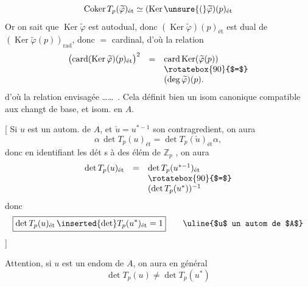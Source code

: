 \[
\operatorname{Coker}T_p(\widetilde\varphi)_{\text{ét}}\simeq(\operatorname{Ker}\unsure{(}\widetilde\varphi)(p)_{\text{ét}}
\]
Or on sait que $\operatorname{Ker}\widetilde\varphi$ est autodual, donc $(\operatorname{Ker}\widetilde\varphi)(p)_{\text{ét}}$ est dual de $(\operatorname{Ker}\widetilde\varphi(p))_{\mathrm{rad}}$, donc $=$ cardinal, d'où la relation
\[
\begin{array}{rcl}
\bigl(\operatorname{card}(\operatorname{Ker}\widetilde\varphi)(p)_{\text{ét}}\bigr)^2&=&\operatorname{card}\operatorname{Ker}(\widetilde\varphi(p))\\
&&\rotatebox{90}{$=$}\\
&& (\deg\widetilde\varphi)(p).
\end{array}
\]
d'où la relation envisagée \ldots\ldots\ . Cela définit bien un isom canonique
compatible aux changt de base, et isom. en $A$.

[ Si $u$ est un autom. de $A$, et $\check u=u^{*-1}$ son contragredient, on aura
\[
\alpha\,\det T_p(u)_{\text{ét}}=\det T_p(\check u)_{\text{ét}}\alpha,
\]
donc en identifiant les dét s à des élém de $\mathbb Z_p$ , on aura
\[
\begin{array}{rcl}
\det T_p(u)_{\text{ét}}&=&\det T_p(u^{*-1})_{\text{ét}}\\
&&\rotatebox{90}{$=$}\\
&& (\det T_p(u^*))^{-1}
\end{array}
\]
donc
\[
\boxed{\det T_p(u)_{\text{ét}}\,\inserted{\det}T_p(u^*)_{\text{ét}}=1}\qquad\text{\uline{$u$ un autom de $A$}}
\]
]

Attention, si $u$ est un endom de $A$, on aura en général
\[
\det T_p(u)\ne\det T_p(u^*)
\]

